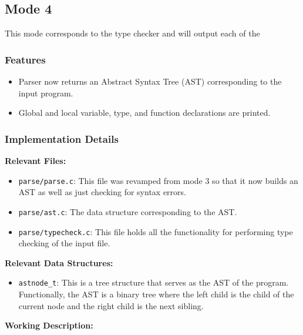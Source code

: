 \subsection{Mode 4}
\label{sec:mode-4}

This mode corresponds to the type checker and will output each of the 

\subsubsection{Features}

\begin{itemize}
    \item Parser now returns an Abstract Syntax Tree (AST) corresponding to the input program.
    \item Global and local variable, type, and function declarations are printed.
\end{itemize}

\subsubsection{Implementation Details}

\textbf{Relevant Files:}

\begin{itemize}
    \item \verb|parse/parse.c|: This file was revamped from mode 3 so that it now builds an AST as well as just checking for syntax errors.
    \item \verb|parse/ast.c|: The data structure corresponding to the AST.
    \item \verb|parse/typecheck.c|: This file holds all the functionality for performing type checking of the input file.
\end{itemize}

\noindent \textbf{Relevant Data Structures:}

\begin{itemize}
    \item \verb|astnode_t|: This is a tree structure that serves as the AST of the program. Functionally, the AST is a binary tree where the left child is the child of the current node and the right child is the next sibling. 
\end{itemize}

\noindent \textbf{Working Description:} 